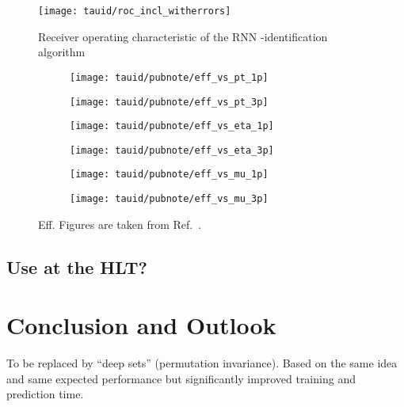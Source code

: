 \begin{figure}[htbp]
  \centering

  \texttt{[image: tauid/roc\_incl\_witherrors]}

  \caption{Receiver operating characteristic of the RNN
    \tauhad-identification algorithm \cite{ATL-PHYS-PUB-2019-033}}%
  \label{fig:tauid_rnn_bdt_roc_comparison}
\end{figure}




\begin{figure}[htbp]

  \begin{subfigure}{0.498\textwidth}
    \texttt{[image: tauid/pubnote/eff\_vs\_pt\_1p]}
    \subcaption{}
  \end{subfigure}\hfill%
  \begin{subfigure}{0.498\textwidth}
    \texttt{[image: tauid/pubnote/eff\_vs\_pt\_3p]}
    \subcaption{}
  \end{subfigure}

  \begin{subfigure}{0.498\textwidth}
    \texttt{[image: tauid/pubnote/eff\_vs\_eta\_1p]}
    \subcaption{}
  \end{subfigure}\hfill%
  \begin{subfigure}{0.498\textwidth}
    \texttt{[image: tauid/pubnote/eff\_vs\_eta\_3p]}
    \subcaption{}
  \end{subfigure}

  \begin{subfigure}{0.498\textwidth}
    \texttt{[image: tauid/pubnote/eff\_vs\_mu\_1p]}
    \subcaption{}
  \end{subfigure}\hfill%
  \begin{subfigure}{0.498\textwidth}
    \texttt{[image: tauid/pubnote/eff\_vs\_mu\_3p]}
    \subcaption{}
  \end{subfigure}

  \caption{Eff. Figures are taken from
    Ref.~\cite{ATL-PHYS-PUB-2019-033}.}
  \label{fig:tauid_truetau_eff}
\end{figure}



\subsection{Use at the HLT?}

\cite{ATL-DAQ-PUB-2019-001}


\section{Conclusion and Outlook}
\label{sec:tauid_conclusion}


To be replaced by ``deep sets'' (permutation invariance). Based on the
same idea and same expected performance but significantly improved
training and prediction time.

